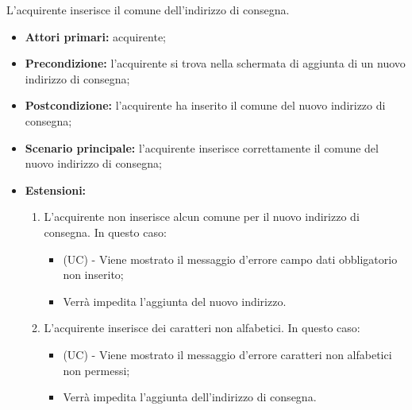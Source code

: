L'acquirente inserisce il comune dell'indirizzo di consegna.
\begin{itemize}
    \item \textbf{Attori primari:} acquirente;
    \item \textbf{Precondizione:} l'acquirente si trova nella schermata di aggiunta di un nuovo indirizzo di consegna;
    \item \textbf{Postcondizione:} l'acquirente ha inserito il comune del nuovo indirizzo di consegna;
    \item \textbf{Scenario principale:} l'acquirente inserisce correttamente il comune del nuovo indirizzo di consegna;
    \item \textbf{Estensioni:}
    \begin{enumerate}[label=\lett]
        \item L'acquirente non inserisce alcun comune per il nuovo indirizzo di consegna. In questo caso:
        \begin{itemize}
            \item (UC) - Viene mostrato il messaggio d'errore campo dati obbligatorio non inserito;
            \item Verrà impedita l'aggiunta del nuovo indirizzo.
        \end{itemize}
        \item L'acquirente inserisce dei caratteri non alfabetici. In questo caso:
        \begin{itemize}
            \item (UC) - Viene mostrato il messaggio d'errore caratteri non alfabetici non permessi;
            \item Verrà impedita l'aggiunta dell'indirizzo di consegna.
        \end{itemize}
    \end{enumerate}
\end{itemize}

